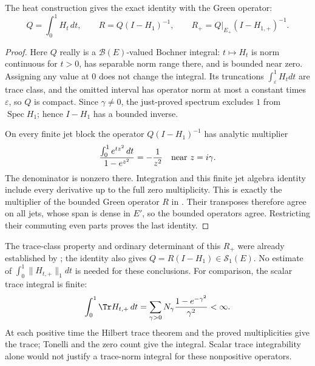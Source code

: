 The heat construction gives the exact identity with the Green operator:
\begin{equation}\label{eq:MasHeatInverse}
 Q=\int_0^1H_t\,dt,\qquad
 R=Q(I-H_1)^{-1},\qquad
 R_+=Q|_{E_+}(I-H_{1,+})^{-1}.
\end{equation}
\begin{proof}
Here $Q$ really is a $\mathcal B(E)$-valued Bochner integral: $t\mapsto H_t$ is norm continuous for $t>0$, has separable norm range there, and is bounded near zero. Assigning any value at $0$ does not change the integral. Its truncations $\int_\varepsilon^1H_tdt$ are trace class, and the omitted interval has operator norm at most a constant times $\varepsilon$, so $Q$ is compact. Since $\gamma\ne0$, the just-proved spectrum excludes $1$ from $\operatorname{Spec}H_1$; hence $I-H_1$ has a bounded inverse.

On every finite jet block the operator $Q(I-H_1)^{-1}$ has analytic multiplier
\[
 \frac{\int_0^1e^{tz^2}\,dt}{1-e^{z^2}}=-\frac1{z^2}
 \quad\hbox{near }z=i\gamma.
\]
The denominator is nonzero there. Integration and this finite jet algebra identity include every derivative up to the full zero multiplicity. This is exactly the multiplier of the bounded Green operator $R$ in . Their transposes therefore agree on all jets, whose span is dense in $E'$, so the bounded operators agree. Restricting their commuting even parts proves the last identity.
\end{proof}
The trace-class property and ordinary determinant of this $R_+$ were already established by ; the identity also gives $Q=R(I-H_1)\in\mathcal S_1(E)$. No estimate of $\int_0^1\|H_{t,+}\|_1dt$ is needed for these conclusions. For comparison, the scalar trace integral is finite:
\[
 \int_0^1\Tr H_{t,+}\,dt
 =\sum_{\gamma>0}N_\gamma\frac{1-e^{-\gamma^2}}{\gamma^2}<\infty.
\]
At each positive time the Hilbert trace theorem and the proved multiplicities give the trace; Tonelli and the zero count give the integral. Scalar trace integrability alone would not justify a trace-norm integral for these nonpositive operators.

